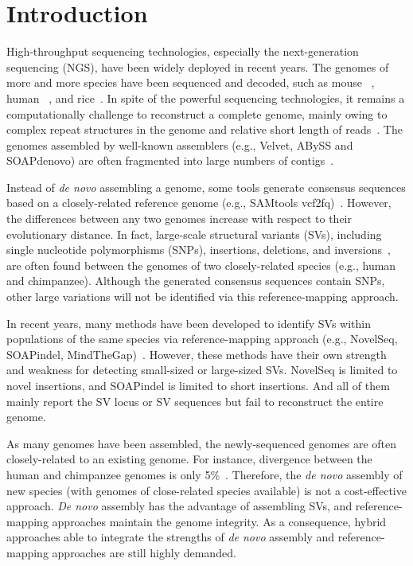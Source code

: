\chapter{Introduction}

    High-throughput sequencing technologies, especially the next-generation sequencing (NGS), have been widely deployed in recent years. The genomes of more and more species have been sequenced and decoded, such as mouse ~\cite{Waterston2002}, human ~\cite{Venter2001}, and rice~\cite{IRGSP}. In spite of the powerful sequencing technologies, it remains a computationally challenge to reconstruct a complete genome, mainly owing to complex repeat structures in the genome and relative short length of reads~\cite{Dunham}. The genomes assembled by well-known assemblers (e.g., Velvet, ABySS and SOAPdenovo) are often fragmented into large numbers of contigs~\cite{Zerbino2008,Simpson2009,Li2008}. 

    Instead of {\em de novo} assembling a genome, some tools generate consensus sequences based on a closely-related reference genome (e.g., SAMtools vcf2fq)~\cite{Samtoolsa,Samtoolsb}. However, the differences between any two genomes increase with respect to their evolutionary distance. In fact, large-scale structural variants (SVs), including single nucleotide polymorphisms (SNPs), insertions, deletions, and inversions~\cite{Mills2006}, are often found between the genomes of two closely-related species (e.g., human and chimpanzee). Although the generated consensus sequences contain SNPs, other large variations will not be identified via this reference-mapping approach. 

   In recent years, many methods have been developed to identify SVs within populations of the same species via reference-mapping approach (e.g., NovelSeq, SOAPindel, MindTheGap)~\cite{Hajirasouliha2010,Shengting2013,Guillaume2014}. However, these methods have their own strength and weakness for detecting small-sized or large-sized SVs. NovelSeq is limited to novel insertions, and SOAPindel is limited to short insertions. And all of them mainly report the SV locus or SV sequences but fail to reconstruct the entire genome. 

   As many genomes have been assembled, the newly-sequenced genomes are often closely-related to an existing genome. For instance, divergence between the human and chimpanzee genomes is only 5\%~\cite{Roy2002}. Therefore, the {\em de novo} assembly of new species (with genomes of close-related species available) is not a cost-effective approach. {\em De novo} assembly has the advantage of assembling SVs, and reference-mapping approaches maintain the genome integrity. As a consequence, hybrid approaches able to integrate the strengths of {\em de novo} assembly and reference-mapping approaches are still highly demanded.

